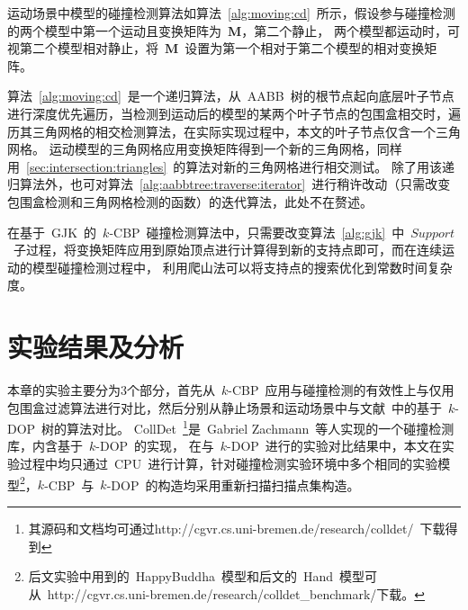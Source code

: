 \begin{algorithm}[!ht]
\end{algorithm}

运动场景中模型的碰撞检测算法如算法~\ref{alg:moving:cd}~所示，假设参与碰撞检测的两个模型中第一个运动且变换矩阵为~$\bm{M}$，第二个静止，
两个模型都运动时，可视第二个模型相对静止，将~$\bm{M}$~设置为第一个相对于第二个模型的相对变换矩阵。

算法~\ref{alg:moving:cd}~是一个递归算法，从~AABB~树的根节点起向底层叶子节点进行深度优先遍历，当检测到运动后的模型的某两个叶子节点的包围盒相交时，遍历其三角网格的相交检测算法，在实际实现过程中，本文的叶子节点仅含一个三角网格。
运动模型的三角网格应用变换矩阵得到一个新的三角网格，同样用~\ref{sec:intersection:triangles}~的算法对新的三角网格进行相交测试。
除了用该递归算法外，也可对算法~\ref{alg:aabbtree:traverse:iterator}~进行稍许改动（只需改变包围盒检测和三角网格检测的函数）的迭代算法，此处不在赘述。

在基于~GJK~的~$k$-CBP~碰撞检测算法中，只需要改变算法~\ref{alg:gjk}~中~$Support$~子过程，将变换矩阵应用到原始顶点进行计算得到新的支持点即可，而在连续运动的模型碰撞检测过程中，
利用爬山法可以将支持点的搜索优化到常数时间复杂度\cite{bergen1999fast}。

\FloatBarrier
\section{实验结果及分析}
\label{sec:exper-cd}
本章的实验主要分为3个部分，首先从~$k$-CBP~应用与碰撞检测的有效性上与仅用包围盒过滤算法进行对比，然后分别从静止场景和运动场景中与文献~中的基于~$k$-DOP~树的算法对比。
CollDet~\footnote{其源码和文档均可通过http://cgvr.cs.uni-bremen.de/research/colldet/~下载得到}是~Gabriel Zachmann~等人实现的一个碰撞检测库\cite{abenchmarking2007}，内含基于~$k$-DOP~的实现，
在与~$k$-DOP~进行的实验对比结果中，本文在实验过程中均只通过~CPU~进行计算，针对碰撞检测实验环境中多个相同的实验模型\footnote{后文实验中用到的~HappyBuddha~模型和后文的~Hand~模型可从~http://cgvr.cs.uni-bremen.de/research/colldet\_benchmark/下载。}，$k$-CBP~与~$k$-DOP~的构造均采用重新扫描扫描点集构造。

